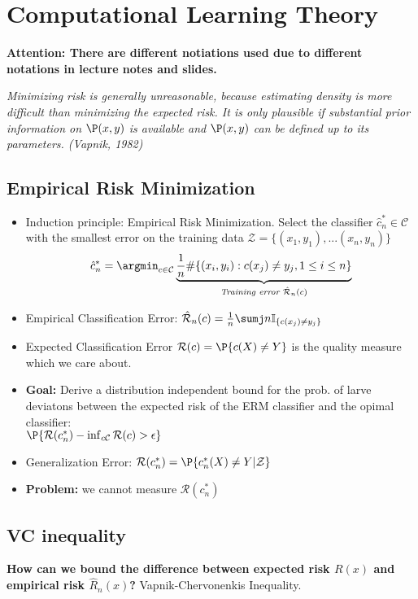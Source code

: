 \section{Computational Learning Theory}
\textbf{Attention: There are different notiations used due to different notations in lecture notes and slides.}

\textit{Minimizing risk is generally unreasonable, because estimating density is more difficult than minimizing the expected risk. It is only plausible if substantial prior information on $\P(x,y)$ is available and $\P(x,y)$ can be defined up to its parameters. (Vapnik, 1982)}
\subsection{Empirical Risk Minimization}
\begin{itemize}
	\item Induction principle: Empirical Risk Minimization. Select the classifier $\hat c_n^*\in\mathcal C$ with the smallest error on the training data $\mathcal Z=\{(x_1, y_1), ... (x_n, y_n)\}$
	$$
		\hat c_n^* = \argmin_{c\in\mathcal C}\underbrace{\frac{1}{n}\#\{(x_i, y_i):c(x_j)\neq y_j, 1\leq i\leq n\}}_{\textit{Training error $\hat{\mathcal R}_n(c)$}}
	$$
	\item Empirical Classification Error: $\hat{\mathcal R}_n(c) = \frac{1}{n}\sumj n \mathbb I_{\{c(x_j)\neq y_j\}}$
	\item Expected Classification Error $\mathcal R(c) = \P\{c(X)\neq Y\}$ is the quality measure which we care about.
	\item \textbf{Goal: } Derive a distribution independent bound for the prob. of larve deviatons between the expected risk of the ERM classifier and the opimal classifier:\\
		$\P\{\mathcal R(c_n^*)-\inf_{c\mathcal C}\mathcal R(c) > \epsilon\}$
	 \item Generalization Error: $\mathcal R(c_n^*)=\P\{c_n^*(X)\neq Y|\mathcal Z\}$
	 \item \textbf{Problem: } we cannot measure $\mathcal R(c_n^*)$
\end{itemize}

\subsection{VC inequality}
\textbf{How can we bound the difference between expected risk $R(x)$ and empirical risk $\hat R_n(x)$?} Vapnik-Chervonenkis Inequality.

